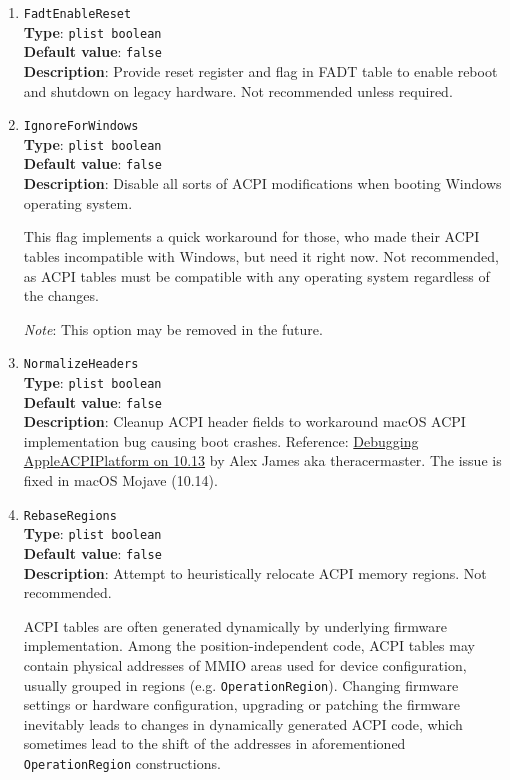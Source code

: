 \documentclass[]{article}
\begin{document}
\begin{enumerate}

\item
  \texttt{FadtEnableReset}\\
  \textbf{Type}: \texttt{plist\ boolean}\\
  \textbf{Default value}: \texttt{false}\\
  \textbf{Description}: Provide reset register and flag in FADT table to enable
  reboot and shutdown on legacy hardware. Not recommended unless required.

\item
  \texttt{IgnoreForWindows}\\
  \textbf{Type}: \texttt{plist\ boolean}\\
  \textbf{Default value}: \texttt{false}\\
  \textbf{Description}: Disable all sorts of ACPI modifications when booting
  Windows operating system.

  This flag implements a quick workaround for those, who made their ACPI tables
  incompatible with Windows, but need it right now. Not recommended, as ACPI
  tables must be compatible with any operating system regardless of the changes.

  \emph{Note}: This option may be removed in the future.

\item
  \texttt{NormalizeHeaders}\\
  \textbf{Type}: \texttt{plist\ boolean}\\
  \textbf{Default value}: \texttt{false}\\
  \textbf{Description}: Cleanup ACPI header fields to workaround macOS
  ACPI implementation bug causing boot crashes. Reference:
  \href{https://alextjam.es/debugging-appleacpiplatform/}{Debugging
  AppleACPIPlatform on 10.13} by Alex James aka theracermaster. The
  issue is fixed in macOS Mojave (10.14).

\item
  \texttt{RebaseRegions}\\
  \textbf{Type}: \texttt{plist\ boolean}\\
  \textbf{Default value}: \texttt{false}\\
  \textbf{Description}: Attempt to heuristically relocate ACPI memory
  regions. Not recommended.

  ACPI tables are often generated dynamically by underlying firmware
  implementation. Among the position-independent code, ACPI tables may
  contain physical addresses of MMIO areas used for device
  configuration, usually grouped in regions (e.g.
  \texttt{OperationRegion}). Changing firmware settings or hardware
  configuration, upgrading or patching the firmware inevitably leads to
  changes in dynamically generated ACPI code, which sometimes lead to
  the shift of the addresses in aforementioned \texttt{OperationRegion}
  constructions.


\end{enumerate}
\end{document}
